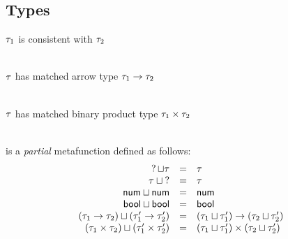 \subsection{Types}
 $\TMV_1$ is consistent with $\TMV_2$
%
\begin{mathpar}




\end{mathpar} \\

 $\TMV$ has matched arrow type $\TArrow{\TMV_1}{\TMV_2}$
%
\begin{mathpar}

\end{mathpar} \\

 $\TMV$ has matched binary product type $\TProd{\TMV_1}{\TMV_2}$
%
\begin{mathpar}

\end{mathpar} \\

 is a \emph{partial} metafunction defined as follows:
%
\newcommand{\joinsTo}[3]{\ensuremath{\TJoin{#1}{#2} & = & #3}}
\[\begin{array}{rcl}
  \joinsTo{\TUnknown}{\TMV}{\TMV} \\
  \joinsTo{\TMV}{\TUnknown}{\TMV} \\
  \joinsTo{\TNum}{\TNum}{\TNum} \\
  \joinsTo{\TBool}{\TBool}{\TBool} \\
  \joinsTo{(\TArrow{\TMV_1}{\TMV_2})}{(\TArrow{\TMV_1'}{\TMV_2'})}{\TArrow{(\TJoin{\TMV_1}{\TMV_1'})}{(\TJoin{\TMV_2}{\TMV_2'})}} \\
  \joinsTo{(\TProd{\TMV_1}{\TMV_2})}{(\TProd{\TMV_1'}{\TMV_2'})}{\TProd{(\TJoin{\TMV_1}{\TMV_1'})}{(\TJoin{\TMV_2}{\TMV_2'})}}
\end{array}\] \\

